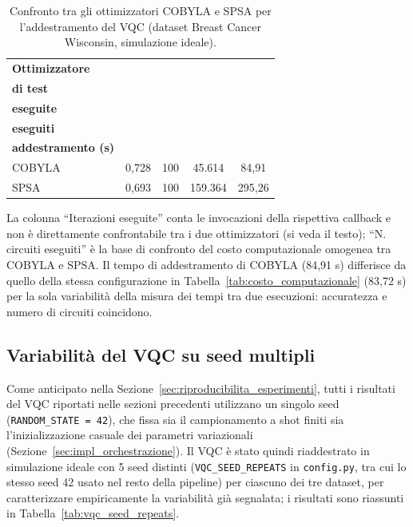 \begin{table}[htbp]
\centering
\caption{Confronto tra gli ottimizzatori COBYLA e SPSA per l'addestramento del VQC (dataset Breast Cancer Wisconsin, simulazione ideale).}
\label{tab:confronto_ottimizzatori}
{\renewcommand{\arraystretch}{1.5} %
\footnotesize
\begin{tabular}{>{\raggedright\arraybackslash}p{2.2cm}cccc}
\toprule
\textbf{Ottimizzatore} & \thead{\textbf{Accuratezza}\\\textbf{di test}} & \thead{\textbf{Iterazioni}\\\textbf{eseguite}} & \thead{\textbf{N. circuiti}\\\textbf{eseguiti}} & \thead{\textbf{Tempo di}\\\textbf{addestramento (s)}} \\
\midrule
COBYLA & 0,728 & 100 & 45.614 & 84,91 \\
SPSA & 0,693 & 100 & 159.364 & 295,26 \\
\bottomrule
\end{tabular}
}

\medskip
{\footnotesize La colonna ``Iterazioni eseguite'' conta le invocazioni della rispettiva callback e non è direttamente confrontabile tra i due ottimizzatori (si veda il testo); ``N. circuiti eseguiti'' è la base di confronto del costo computazionale omogenea tra COBYLA e SPSA. Il tempo di addestramento di COBYLA (84,91 s) differisce da quello della stessa configurazione in Tabella~\ref{tab:costo_computazionale} (83,72 s) per la sola variabilità della misura dei tempi tra due esecuzioni: accuratezza e numero di circuiti coincidono.}
\end{table}

\subsection{Variabilità del VQC su seed multipli}
\label{sec:variabilita_vqc_seed}

Come anticipato nella Sezione~\ref{sec:riproducibilita_esperimenti}, tutti i risultati del VQC riportati nelle sezioni precedenti utilizzano un singolo seed (\texttt{RANDOM\_STATE = 42}), che fissa sia il campionamento a shot finiti sia l'inizializzazione casuale dei parametri variazionali (Sezione~\ref{sec:impl_orchestrazione}). Il VQC è stato quindi riaddestrato in simulazione ideale con 5 seed distinti (\texttt{VQC\_SEED\_REPEATS} in \texttt{config.py}, tra cui lo stesso seed 42 usato nel resto della pipeline) per ciascuno dei tre dataset, per caratterizzare empiricamente la variabilità già segnalata; i risultati sono riassunti in Tabella~\ref{tab:vqc_seed_repeats}.

